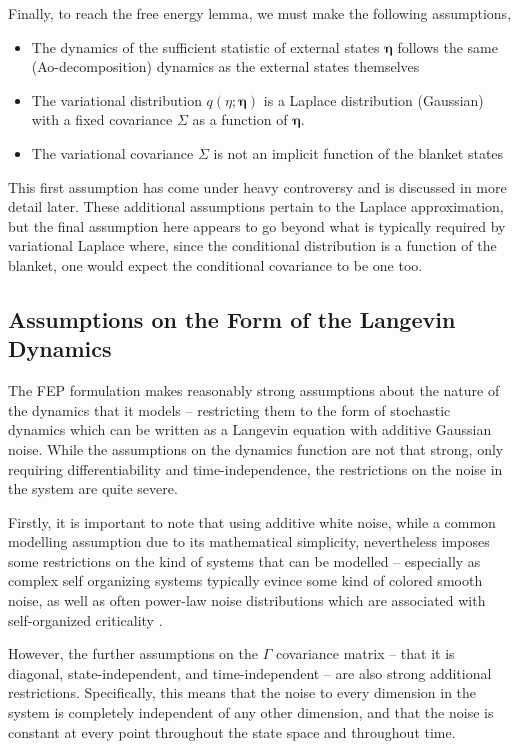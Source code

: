 Finally, to reach the free energy lemma, we must make the following assumptions,
\begin{itemize}
  \item The dynamics of the sufficient statistic of external states $\bm{\eta}$ follows the same (Ao-decomposition) dynamics as the external states themselves
  \item The variational distribution $q(\eta;\bm{\eta})$ is a Laplace distribution (Gaussian) with a fixed covariance $\Sigma$ as a function of $\bm{\eta}$.
  \item The variational covariance $\Sigma$ is not an implicit function of the blanket states
\end{itemize}
This first assumption has come under heavy controversy and is discussed in more detail later. These additional assumptions pertain to the Laplace approximation, but the final assumption here appears to go beyond what is typically required by variational Laplace where, since the conditional distribution is a function of the blanket, one would expect the conditional covariance to be one too.

\subsection{Assumptions on the Form of the Langevin Dynamics}

The FEP formulation makes reasonably strong assumptions about the nature of the dynamics that it models -- restricting them to the form of stochastic dynamics which can be written as a Langevin equation with additive Gaussian noise. While the assumptions on the dynamics function are not that strong, only requiring differentiability and time-independence, the restrictions on the noise in the system are quite severe.

Firstly, it is important to note that using additive white noise, while a common modelling assumption due to its mathematical simplicity, nevertheless imposes some restrictions on the kind of systems that can be modelled -- especially as complex self organizing systems typically evince some kind of colored smooth noise, as well as often power-law noise distributions which are associated with self-organized criticality \citep{ovchinnikov2016introduction}.

However, the further assumptions on the $\Gamma$ covariance matrix -- that it is diagonal, state-independent, and time-independent -- are also strong additional restrictions. Specifically, this means that the noise to every dimension in the system is completely independent of any other dimension, and that the noise is constant at every point throughout the state space and throughout time.
